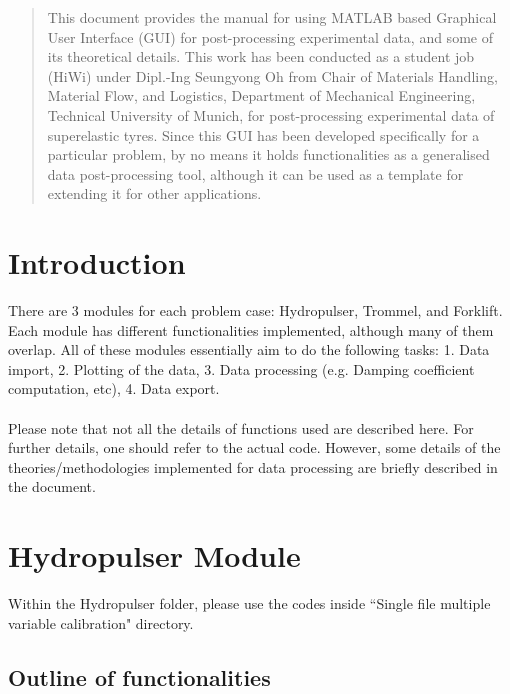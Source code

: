 \documentclass[12pt]{article}
\begin{document}
\maketitle

\begin{abstract}
This document provides the manual for using MATLAB based Graphical User
Interface (GUI) for post-processing experimental data, and some of its
theoretical details. This work has been conducted as a student job (HiWi) under
Dipl.-Ing Seungyong Oh from Chair of Materials Handling, Material Flow, and
Logistics, Department of Mechanical Engineering, Technical University of
Munich, for post-processing experimental data of superelastic tyres. Since this
GUI has been developed specifically for a particular problem, by no means it
holds functionalities as a generalised data post-processing tool, although it
can be used as a template for extending it for other applications.
\end{abstract}

\section{Introduction}
There are 3 modules for each problem case: Hydropulser, Trommel, and Forklift.
Each module has different functionalities implemented, although many of them
overlap. All of these     modules essentially aim to do the following tasks: 1.
Data import, 2. Plotting of the data, 3. Data processing (e.g. Damping
coefficient computation, etc), 4. Data export.\\ 
\\
Please note that not all the details of functions used are described here.
For further details, one should refer to the actual code. However, some details
of the theories/methodologies implemented for data processing are briefly
described in the document.

\section{Hydropulser Module}\label{Hydropulser}
Within the Hydropulser folder, please use the codes inside ``Single file multiple variable calibration" directory.

\subsection{Outline of functionalities}
\end{document}
